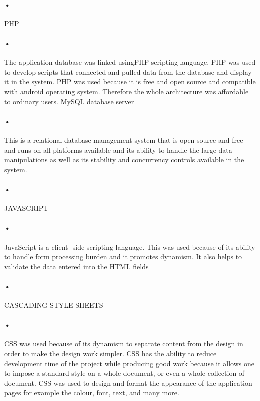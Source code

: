 \documentclass[12pt]{article}
\begin{document}
\paragraph{•}PHP
\paragraph{•}The application database was linked usingPHP scripting language. PHP was used to develop scripts that connected and pulled data from the database and display it in the system. PHP was used because it is free and open source and compatible with android operating system. Therefore the whole architecture was affordable to ordinary users.
MySQL database server
\paragraph{•}This is a relational database management system that is open source and free and runs on all platforms available and its ability to handle the large data manipulations as well as its stability and concurrency controls available in the system.

\paragraph{•}JAVASCRIPT
\paragraph{•}JavaScript is a client- side scripting language. This was used because of its ability to handle form processing burden and it promotes dynamism. It also helps to validate the data entered into the HTML fields

\paragraph{•} CASCADING STYLE SHEETS
\paragraph{•}CSS was used because of its dynamism to separate content from the design in order to make the design work simpler. CSS has the ability to reduce development time of the project while producing good work because it allows one to impose a standard style on a whole document, or even a whole collection of document. CSS was used to design and format the appearance of the application pages for example the colour, font, text, and many more.
\end{document}
